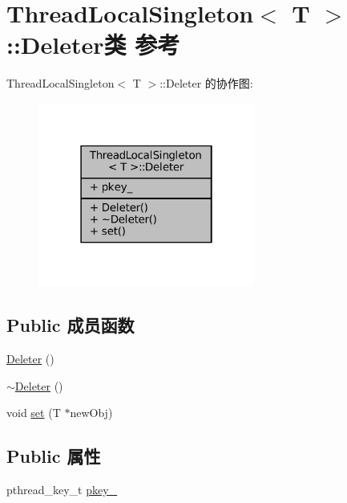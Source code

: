 \hypertarget{classmuduo_1_1ThreadLocalSingleton_1_1Deleter}{}\section{Thread\+Local\+Singleton$<$ T $>$\+:\+:Deleter类 参考}
\label{classmuduo_1_1ThreadLocalSingleton_1_1Deleter}


Thread\+Local\+Singleton$<$ T $>$\+:\+:Deleter 的协作图\+:
\nopagebreak
\begin{figure}[H]
\begin{center}
\leavevmode
\includegraphics[width=202pt]{classmuduo_1_1ThreadLocalSingleton_1_1Deleter__coll__graph}
\end{center}
\end{figure}
\subsection*{Public 成员函数}
\begin{DoxyCompactItemize}
\item 
\hyperlink{classmuduo_1_1ThreadLocalSingleton_1_1Deleter_aaf39a259c3fafa94424594d8a628e168}{Deleter} ()
\item 
\hyperlink{classmuduo_1_1ThreadLocalSingleton_1_1Deleter_a1b98a9e8ffc0353ade7259f4fa205f12}{$\sim$\+Deleter} ()
\item 
void \hyperlink{classmuduo_1_1ThreadLocalSingleton_1_1Deleter_a7f9f5041a16baf883423c1ca895b5f46}{set} (T $\ast$new\+Obj)
\end{DoxyCompactItemize}
\subsection*{Public 属性}
\begin{DoxyCompactItemize}
\item 
pthread\+\_\+key\+\_\+t \hyperlink{classmuduo_1_1ThreadLocalSingleton_1_1Deleter_a10ef6ab4122ca7977f07a8c475f54017}{pkey\+\_\+}
\end{DoxyCompactItemize}


